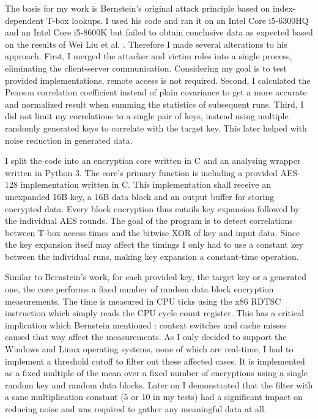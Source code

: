 \documentclass{article}
\begin{document}
The basis for my work is Bernstein's original attack principle based on index-dependent T-box lookups.
I used his code and ran it on an Intel Core i5-6300HQ and an Intel Core i5-8600K but failed to obtain conclusive data as expected based on the results of Wei Liu et al. \cite{WEI}.
Therefore I made several alterations to his approach.
First, I merged the attacker and victim roles into a single process, eliminating the client-server communication. Considering my goal is to test provided implementations, remote access is not required.
Second, I calculated the Pearson correlation coefficient instead of plain covariance \cite[pp. 33-35]{bernstein2005cache} to get a more accurate and normalized result when summing the statistics of subsequent runs.
Third, I did not limit my correlations to a single pair of keys, instead using multiple randomly generated keys to correlate with the target key. This later helped with noise reduction in generated data.

I split the code into an encryption core written in C and an analysing wrapper written in Python 3.
The core's primary function is including a provided AES-128 implementation written in C. This implementation shall receive an unexpanded 16B key, a 16B data block and an output buffer for storing encrypted data.
Every block encryption thus entails key expansion followed by the individual AES rounds.
The goal of the program is to detect correlations between T-box access times and the bitwise XOR of key and input data.
Since the key expansion itself may affect the timings I only had to use a constant key between the individual runs, making key expansion a constant-time operation.

Similar to Bernstein's work, for each provided key, the target key or a generated one, the core performs a fixed number of random data block encryption measurements.
The time is measured in CPU ticks using the x86 RDTSC instruction which simply reads the CPU cycle count register.
This has a critical implication which Bernstein mentioned \cite[p. 21]{bernstein2005cache}: context switches and cache misses caused that way affect the measurements.
As I only decided to support the Windows and Linux operating systems, none of which are real-time, I had to implement a threshold cutoff to filter out these affected cases.
It is implemented as a fixed multiple of the mean over a fixed number of encryptions using a single random key and random data blocks.
Later on I demonstrated that the filter with a sane multiplication constant (5 or 10 in my tests) had a significant impact on reducing noise and was required to gather any meaningful data at all.
\end{document}
